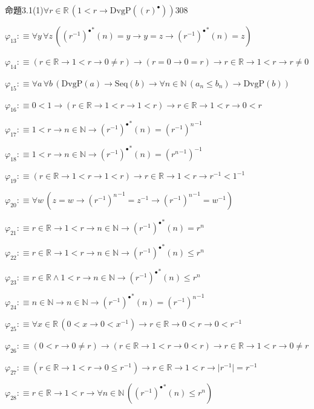 \begin{fullproof}{命題3.1(1)}{$\forall r \in \mathbb{R}\,(1 < r \to \mathrm{DvgP}({(r)^{\bullet}}))$}{308}
\begin{abbrevlist}
\item $\varphi_{13} :\equiv \forall y\,\forall z\,({(r^{-1})^{\bullet}}^{\ast}(n) = y \to y = z \to {(r^{-1})^{\bullet}}^{\ast}(n) = z)$
\item $\varphi_{14} :\equiv (r \in \mathbb{R} \to 1 < r \to 0 \neq r) \to (r = 0 \to 0 = r) \to r \in \mathbb{R} \to 1 < r \to r \neq 0$
\item $\varphi_{15} :\equiv \forall a\,\forall b\,(\mathrm{DvgP}(a) \to \mathrm{Seq}(b) \to \forall n \in \mathbb{N}\,(a_{n} \leq b_{n}) \to \mathrm{DvgP}(b))$
\item $\varphi_{16} :\equiv 0 < 1 \to (r \in \mathbb{R} \to 1 < r \to 1 < r) \to r \in \mathbb{R} \to 1 < r \to 0 < r$
\item $\varphi_{17} :\equiv 1 < r \to n \in \mathbb{N} \to {(r^{-1})^{\bullet}}^{\ast}(n) = {{(r^{-1})}^{n}}^{-1}$
\item $\varphi_{18} :\equiv 1 < r \to n \in \mathbb{N} \to {(r^{-1})^{\bullet}}^{\ast}(n) = ({{r}^{n}}^{-1})^{-1}$
\item $\varphi_{19} :\equiv (r \in \mathbb{R} \to 1 < r \to 1 < r) \to r \in \mathbb{R} \to 1 < r \to r^{-1} < 1^{-1}$
\item $\varphi_{20} :\equiv \forall w\,(z = w \to {{(r^{-1})}^{n}}^{-1} = z^{-1} \to {{(r^{-1})}^{n}}^{-1} = w^{-1})$
\item $\varphi_{21} :\equiv r \in \mathbb{R} \to 1 < r \to n \in \mathbb{N} \to {(r^{-1})^{\bullet}}^{\ast}(n) = {{r}^{n}}$
\item $\varphi_{22} :\equiv r \in \mathbb{R} \to 1 < r \to n \in \mathbb{N} \to {(r^{-1})^{\bullet}}^{\ast}(n) \leq {{r}^{n}}$
\item $\varphi_{23} :\equiv r \in \mathbb{R} \land 1 < r \to n \in \mathbb{N} \to {(r^{-1})^{\bullet}}^{\ast}(n) \leq {{r}^{n}}$
\item $\varphi_{24} :\equiv n \in \mathbb{N} \to n \in \mathbb{N} \to {(r^{-1})^{\bullet}}^{\ast}(n) = {{(r^{-1})}^{n}}^{-1}$
\item $\varphi_{25} :\equiv \forall x \in \mathbb{R}\,(0 < x \to 0 < x^{-1}) \to r \in \mathbb{R} \to 0 < r \to 0 < r^{-1}$
\item $\varphi_{26} :\equiv (0 < r \to 0 \neq r) \to (r \in \mathbb{R} \to 1 < r \to 0 < r) \to r \in \mathbb{R} \to 1 < r \to 0 \neq r$
\item $\varphi_{27} :\equiv (r \in \mathbb{R} \to 1 < r \to 0 \leq r^{-1}) \to r \in \mathbb{R} \to 1 < r \to \lvert r^{-1} \rvert = r^{-1}$
\item $\varphi_{28} :\equiv r \in \mathbb{R} \to 1 < r \to \forall n \in \mathbb{N}\,({(r^{-1})^{\bullet}}^{\ast}(n) \leq {{r}^{n}})$

\end{abbrevlist}
\end{fullproof}
